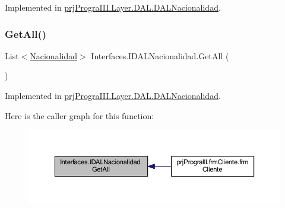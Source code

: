 Implemented in \hyperlink{classprj_progra_i_i_i_1_1_layer_1_1_d_a_l_1_1_d_a_l_nacionalidad_aaae73fec1bc1e05c37358116139ce47a}{prj\+Progra\+I\+I\+I.\+Layer.\+D\+A\+L.\+D\+A\+L\+Nacionalidad}.

\hypertarget{interface_interfaces_1_1_i_d_a_l_nacionalidad_a9c4069ad5642445a09d011062b91c9f5}{}\label{interface_interfaces_1_1_i_d_a_l_nacionalidad_a9c4069ad5642445a09d011062b91c9f5} 
\subsubsection{\texorpdfstring{Get\+All()}{GetAll()}}
{\footnotesize\ttfamily List$<$\hyperlink{classprj_progra_i_i_i_1_1_layer_1_1_entities_1_1_nacionalidad}{Nacionalidad}$>$ Interfaces.\+I\+D\+A\+L\+Nacionalidad.\+Get\+All (\begin{DoxyParamCaption}{ }\end{DoxyParamCaption})}



Implemented in \hyperlink{classprj_progra_i_i_i_1_1_layer_1_1_d_a_l_1_1_d_a_l_nacionalidad_a7a851ef044363eb2a9be47aaa154b40b}{prj\+Progra\+I\+I\+I.\+Layer.\+D\+A\+L.\+D\+A\+L\+Nacionalidad}.

Here is the caller graph for this function\+:
\nopagebreak
\begin{figure}[H]
\begin{center}
\leavevmode
\includegraphics[width=350pt]{interface_interfaces_1_1_i_d_a_l_nacionalidad_a9c4069ad5642445a09d011062b91c9f5_icgraph}
\end{center}
\end{figure}
\hypertarget{interface_interfaces_1_1_i_d_a_l_nacionalidad_ac11f146d5f5b2a50ef33998088a93fef}{}\label{interface_interfaces_1_1_i_d_a_l_nacionalidad_ac11f146d5f5b2a50ef33998088a93fef} 
